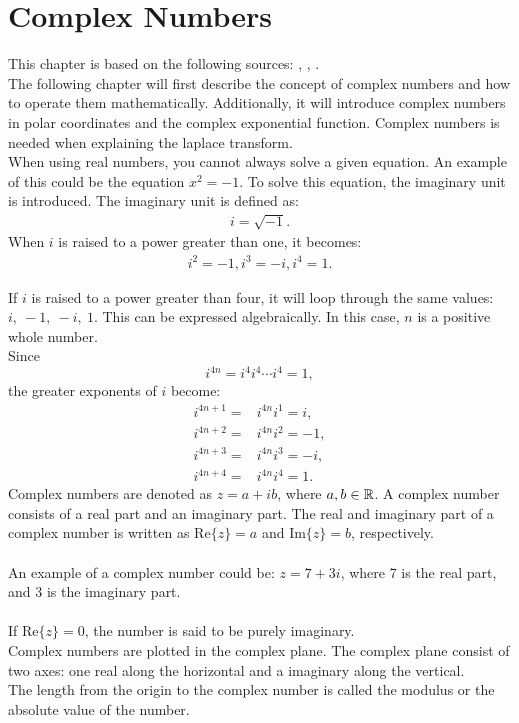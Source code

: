 \chapter{Complex Numbers}
This chapter is based on the following sources: \cite{complexpaul}, \cite{complexpurple}, \cite{complexnotebook}.
\\
\noindent 
The following chapter will first describe the concept of complex numbers and how to operate them mathematically. Additionally, it will introduce complex numbers in polar coordinates and the complex exponential function. Complex numbers is needed when explaining the laplace transform.
\\
\noindent 
When using real numbers, you cannot always solve a given equation. An example of this could be the equation $x^2=-1$. To solve this equation, the imaginary unit is introduced. The imaginary unit is defined as:
\begin{align*}
i=\sqrt{-1}.
\end{align*}
When $i$ is raised to a power greater than one, it becomes:
\begin{align*}
i^2=-1, i^3=-i, i^4=1.
\end{align*}

\noindent If $i$ is raised to a power greater than four, it will loop through the same values: $i, \ -1, \ -i, \ 1$. This can be expressed algebraically. In this case, $n$ is a  positive whole number. 
\\
Since $$i^{4n} = i^4i^4\cdots i^4 = 1,$$
the greater exponents of $i$ become:
\begin{align*}
	i^{4n+1} =& i^{4n}i^1 = i, \\
	i^{4n+2} =& i^{4n}i^2 = -1, \\
	i^{4n+3} =& i^{4n}i^3 = -i, \\
	i^{4n+4} =& i^{4n}i^4 = 1.
\end{align*}
Complex numbers are denoted as $z = a+ib$, where $a,b\in \mathbb{R}$. A complex number consists of a real part and an imaginary part. The real and imaginary part of a complex number is written as $\text{Re}\{z\}=a$ and $\text{Im}\{z\}=b$, respectively.
\\
\\
An example of a complex number could be: $z=7+3i$, where 7 is the real part, and 3 is the imaginary part. 
\\
\\
If $\text{Re}\{z\}=0$, the number is said to be purely imaginary.  
\\
Complex numbers are plotted in the complex plane. The complex plane consist of two axes: one real along the horizontal and a imaginary along the vertical.\\
The length from the origin to the complex number is called the modulus or the absolute value of the number.

